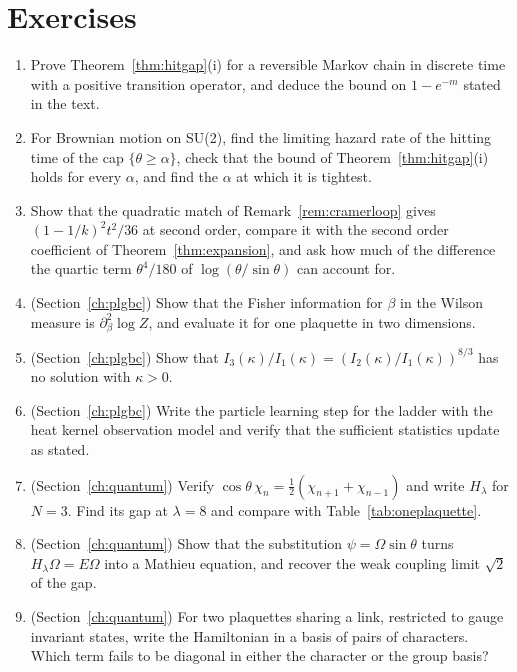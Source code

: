 \section*{Exercises}
\begin{enumerate}
\item Prove Theorem~\ref{thm:hitgap}(i) for a reversible Markov chain in discrete time with a positive transition operator, and deduce the bound on $1-e^{-m}$ stated in the text.
\item For Brownian motion on SU(2), find the limiting hazard rate of the hitting time of the cap $\{\theta\ge\alpha\}$, check that the bound of Theorem~\ref{thm:hitgap}(i) holds for every $\alpha$, and find the $\alpha$ at which it is tightest.
\item Show that the quadratic match of Remark~\ref{rem:cramerloop} gives $(1-1/k)^2t^2/36$ at second order, compare it with the second order coefficient of Theorem~\ref{thm:expansion}, and ask how much of the difference the quartic term $\theta^4/180$ of $\log(\theta/\sin\theta)$ can account for.
\item (Section~\ref{ch:plgbc}) Show that the Fisher information for $\beta$ in the Wilson measure is $\partial_\beta^2\log Z$, and evaluate it for one plaquette in two dimensions.
\item (Section~\ref{ch:plgbc}) Show that $I_3(\kappa)/I_1(\kappa)=(I_2(\kappa)/I_1(\kappa))^{8/3}$ has no solution with $\kappa>0$.
\item (Section~\ref{ch:plgbc}) Write the particle learning step for the ladder with the heat kernel observation model and verify that the sufficient statistics update as stated.
\item (Section~\ref{ch:quantum}) Verify $\cos\theta\,\chi_n=\frac12(\chi_{n+1}+\chi_{n-1})$ and write $H_\lambda$ for $N=3$. Find its gap at $\lambda=8$ and compare with Table~\ref{tab:oneplaquette}.
\item (Section~\ref{ch:quantum}) Show that the substitution $\psi=\Omega\sin\theta$ turns $H_\lambda\Omega=E\Omega$ into a Mathieu equation, and recover the weak coupling limit $\sqrt2$ of the gap.
\item (Section~\ref{ch:quantum}) For two plaquettes sharing a link, restricted to gauge invariant states, write the Hamiltonian in a basis of pairs of characters. Which term fails to be diagonal in either the character or the group basis?
\end{enumerate}
